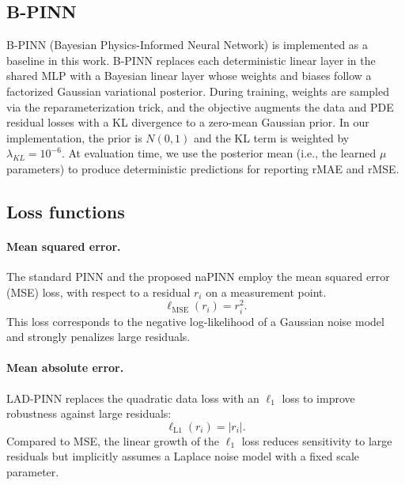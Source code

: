 \documentclass{article}
\theoremstyle{plain}
\theoremstyle{definition}
\theoremstyle{remark}
\begin{document}
\subsection{B-PINN}
B-PINN (Bayesian Physics-Informed Neural Network) is implemented as a baseline in this work. B-PINN replaces each deterministic linear layer in the shared MLP with a Bayesian linear layer whose weights and biases follow a factorized Gaussian variational posterior. During training, weights are sampled via the reparameterization trick, and the objective augments the data and PDE residual losses with a KL divergence to a zero-mean Gaussian prior. In our implementation, the prior is $N(0,1)$ and the KL term is weighted by $\lambda_{KL} = 10^{-6}$. At evaluation time, we use the posterior mean (i.e., the learned $\mu$ parameters) to produce deterministic predictions for reporting rMAE and rMSE.

\subsection{Loss functions}
\paragraph{Mean squared error.} The standard PINN and the proposed naPINN employ the mean squared error (MSE) loss, with respect to a residual $r_i$ on a measurement point.
\begin{equation}
    \ell_\mathrm{MSE}(r_i) = r_i^2.
\end{equation}
This loss corresponds to the negative log-likelihood of a Gaussian noise model and strongly penalizes large residuals.

\paragraph{Mean absolute error.} LAD-PINN replaces the quadratic data loss with an $\ell_1$ loss to improve robustness against large residuals:
\begin{equation}
    \ell_\mathrm{L1}(r_i) = |r_i|.
\end{equation}
Compared to MSE, the linear growth of the $\ell_1$ loss reduces sensitivity to large residuals but implicitly assumes a Laplace noise model with a fixed scale parameter.
\end{document}

